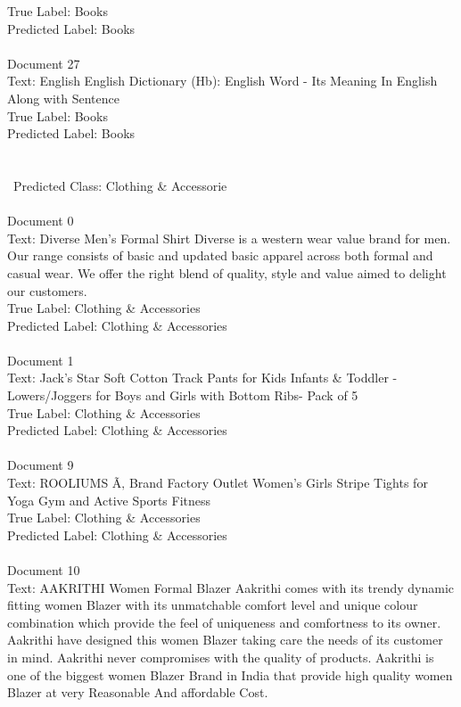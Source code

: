 \documentclass[a4paper,12pt]{article}
\begin{document}
{True Label: Books\\
Predicted Label: Books
\\
\\ Document 27\\
Text: English English Dictionary  (Hb): English Word - Its Meaning In English Along with Sentence \\
True Label: Books\\
Predicted Label: Books\\
\\\\\ Predicted Class: Clothing \& Accessorie\\
\\ Document 0\\
Text: Diverse Men's Formal Shirt Diverse is a western wear value brand for men. Our range consists of basic and updated basic apparel across both formal and casual wear. We offer the right blend of quality, style and value aimed to delight our customers.\\
True Label: Clothing \& Accessories\\
Predicted Label: Clothing \& Accessories\\
\\Document 1\\
Text: Jack's Star Soft Cotton Track Pants for Kids Infants \& Toddler - Lowers/Joggers for Boys and Girls with Bottom Ribs- Pack of 5\\
True Label: Clothing \& Accessories\\
Predicted Label: Clothing \& Accessories\\
\\ Document 9\\
Text: ROOLIUMS Ã‚ Brand Factory Outlet Women's Girls Stripe Tights for Yoga Gym and Active Sports Fitness\\
True Label: Clothing \& Accessories\\
Predicted Label: Clothing \& Accessories
\\
\\Document 10\\
Text: AAKRITHI Women Formal Blazer Aakrithi comes with its trendy dynamic fitting women Blazer with its unmatchable comfort level and unique colour combination which provide the feel of uniqueness and comfortness to its owner. Aakrithi have designed this women Blazer taking care the needs of its customer in mind. Aakrithi never compromises with the quality of products. Aakrithi is one of the biggest women Blazer Brand in India that provide high quality women Blazer at very Reasonable And affordable Cost.\\
}
\end{document}
